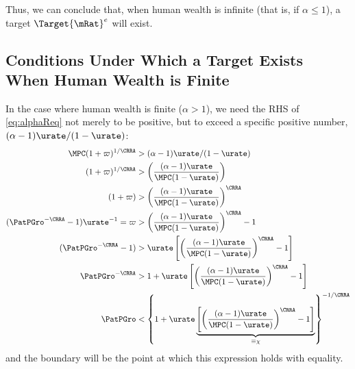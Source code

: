\documentclass{handout}
\begin{document}
Thus, we can conclude that, when human wealth is infinite (that is, if $\alpha \leq 1$), a target $\Target{\mRat}^{e}$ will exist.  

\subsection{Conditions Under Which a Target Exists When Human Wealth is Finite}

In the case where human wealth is finite ($\alpha > 1$), we need the RHS of \eqref{eq:alphaReq} not merely to be positive, but to exceed a specific positive number, $(\alpha-1)\urate/(1-\urate)$:  
\begin{equation}\begin{gathered}\begin{aligned}
    \MPCU (1+\varpi)^{1/\CRRA} & >  (\alpha-1)\urate/(1-\urate)
\\   (1+\varpi)^{1/\CRRA} & >  \left(\frac{(\alpha-1)\urate}{\MPCU (1-\urate)}\right)
\\   (1+\varpi) & >  \left(\frac{(\alpha-1)\urate}{\MPCU (1-\urate)}\right)^{\CRRA}
\\  (\PatPGro^{-\CRRA}-1)\urate^{-1} = \varpi & >  \left(\frac{(\alpha-1)\urate}{\MPCU (1-\urate)}\right)^{\CRRA}-1
\\  (\PatPGro^{-\CRRA}-1) & >  \urate \left[\left(\frac{(\alpha-1)\urate}{\MPCU (1-\urate)}\right)^{\CRRA}-1\right]
\\  \PatPGro^{-\CRRA} & >  1  + \urate \left[\left(\frac{(\alpha-1)\urate}{\MPCU (1-\urate)}\right)^{\CRRA}-1\right]
\\  \PatPGro & <  \left\{1  + \urate \underbrace{\left[\left(\frac{(\alpha-1)\urate}{\MPCU (1-\urate)}\right)^{\CRRA}-1\right]}_{\equiv \chi} \right\}^{-1/\CRRA} \label{eq:PatPGroReqForTarget}
\end{aligned}\end{gathered}\end{equation}
and the boundary will be the point at which this expression holds with equality.  
\end{document}
